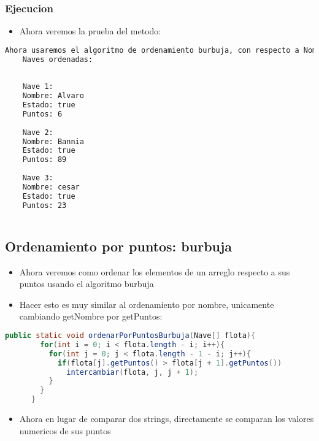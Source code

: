 \subsubsection{Ejecucion}
\begin{itemize}
    \item Ahora veremos la prueba del metodo:
\end{itemize}
    \begin{lstlisting}[language=bash, caption={Prueba del metodo}]
    Ahora usaremos el algoritmo de ordenamiento burbuja, con respecto a Nombres.
    Naves ordenadas:
    
    
    Nave 1:
    Nombre: Alvaro
    Estado: true
    Puntos: 6
    
    Nave 2:
    Nombre: Bannia
    Estado: true
    Puntos: 89
    
    Nave 3:
    Nombre: cesar
    Estado: true
    Puntos: 23
    
\end{lstlisting}
\subsection{Ordenamiento por puntos: burbuja}
\begin{itemize}
    \item Ahora veremos como ordenar los elementos de un arreglo respecto a sus puntos usando el algoritmo burbuja
    \item Hacer esto es muy similar al ordenamiento por nombre, unicamente cambiando getNombre por getPuntos:
\end{itemize}
\begin{lstlisting}[language=java, caption={Metodo para ordenar por puntos}]
      public static void ordenarPorPuntosBurbuja(Nave[] flota){
        for(int i = 0; i < flota.length - i; i++){
          for(int j = 0; j < flota.length - 1 - i; j++){
            if(flota[j].getPuntos() > flota[j + 1].getPuntos())
              intercambiar(flota, j, j + 1);
          }
        }
      }
\end{lstlisting}
\begin{itemize}
    \item Ahora en lugar de comparar dos strings, directamente se comparan los valores numericos de sus puntos
\end{itemize}
